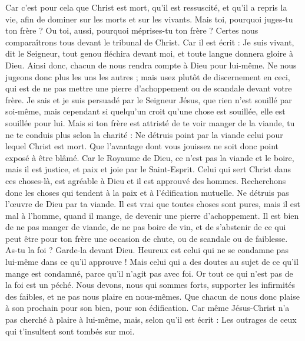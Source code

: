 \begin{multicols}{2}
Car c'est pour cela que Christ est mort, qu'il est ressuscité, et qu'il a repris la vie, afin de dominer sur les morts et sur les vivants.
Mais toi, pourquoi juges-tu ton frère ? Ou toi, aussi, pourquoi méprises-tu ton frère ? Certes nous comparaîtrons tous devant le tribunal de Christ.
Car il est écrit : Je suis vivant, dit le Seigneur, tout genou fléchira devant moi, et toute langue donnera gloire à Dieu.
 Ainsi donc, chacun de nous rendra compte à Dieu pour lui-même.
Ne nous jugeons donc plus les uns les autres ; mais usez plutôt de discernement en ceci, qui est de ne pas mettre une pierre d'achoppement ou de scandale devant votre frère.
Je sais et je suis persuadé par le Seigneur Jésus, que rien n'est souillé par soi-même, mais cependant si quelqu'un croit qu'une chose est souillée, elle est souillée pour lui.
Mais si ton frère est attristé de te voir manger de la viande, tu ne te conduis plus selon la charité : Ne détruis point par la viande celui pour lequel Christ est mort.
Que l'avantage dont vous jouissez ne soit donc point exposé à être blâmé.
Car le Royaume de Dieu, ce n'est pas la viande et le boire, mais il est justice, et paix et joie par le Saint-Esprit.
Celui qui sert Christ dans ces choses-là, est agréable à Dieu et il est approuvé des hommes.
Recherchons donc les choses qui tendent à la paix et à l'édification mutuelle.
Ne détruis pas l'œuvre de Dieu par ta viande. Il est vrai que toutes choses sont pures, mais il est mal à l'homme, quand il mange, de devenir une pierre d'achoppement.
Il est bien de ne pas manger de viande, de ne pas boire de vin, et de s'abstenir de ce qui peut être pour ton frère une occasion de chute, ou de scandale ou de faiblesse.
As-tu la foi ? Garde-la devant Dieu. Heureux est celui qui ne se condamne pas lui-même dans ce qu'il approuve !
Mais celui qui a des doutes au sujet de ce qu'il mange est condamné, parce qu'il n'agit pas avec foi. Or tout ce qui n'est pas de la foi est un péché.
\VerseOne{}Nous devons, nous qui sommes forts, supporter les infirmités des faibles, et ne pas nous plaire en nous-mêmes.
Que chacun de nous donc plaise à son prochain pour son bien, pour son édification.
Car même Jésus-Christ n'a pas cherché à plaire à lui-même, mais, selon qu'il est écrit : Les outrages de ceux qui t'insultent sont tombés sur moi.

\end{multicols}
